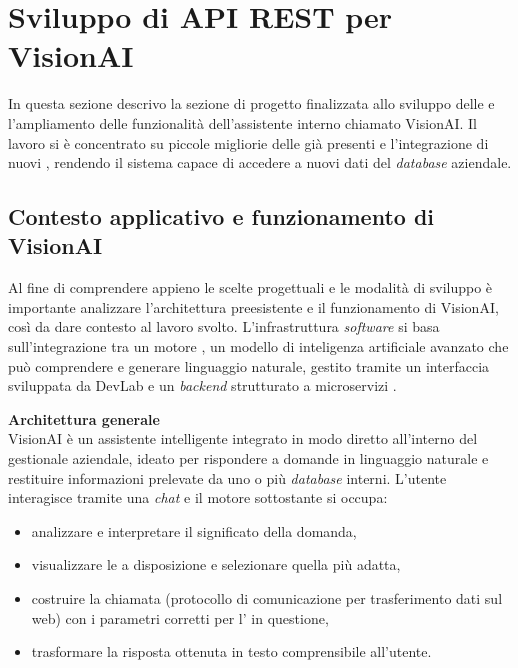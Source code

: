 \section{Sviluppo di API REST per VisionAI}
In questa sezione descrivo la sezione di progetto finalizzata allo sviluppo delle   e l'ampliamento delle funzionalità dell'assistente interno chiamato VisionAI. Il lavoro si è concentrato su piccole migliorie delle  già presenti e l'integrazione di nuovi , rendendo il sistema capace di accedere a nuovi dati del \textit{database} aziendale.


\subsection{Contesto applicativo e funzionamento di VisionAI}
Al fine di comprendere appieno le scelte progettuali e le modalità di sviluppo è importante analizzare l'architettura preesistente e il funzionamento di VisionAI, così da dare contesto al lavoro svolto. L'infrastruttura \textit{software} si basa sull'integrazione tra un motore , un modello di inteligenza artificiale avanzato che può comprendere e generare linguaggio naturale, gestito tramite un interfaccia sviluppata da DevLab e un \textit{backend} strutturato a microservizi .

\textbf{Architettura generale} \\
VisionAI è un assistente intelligente integrato in modo diretto all'interno del gestionale aziendale, ideato per rispondere a domande in linguaggio naturale e restituire informazioni prelevate da uno o più \textit{database} interni.
L'utente interagisce tramite una \textit{chat} e il motore sottostante si occupa:
\begin{itemize}
    \item analizzare e interpretare il significato della domanda,
    \item visualizzare le  a disposizione e selezionare quella più adatta,
    \item costruire la chiamata  (protocollo di comunicazione per trasferimento dati sul web) con i parametri corretti per l' in questione,
    \item trasformare la risposta ottenuta in testo comprensibile all'utente.
\end{itemize}

